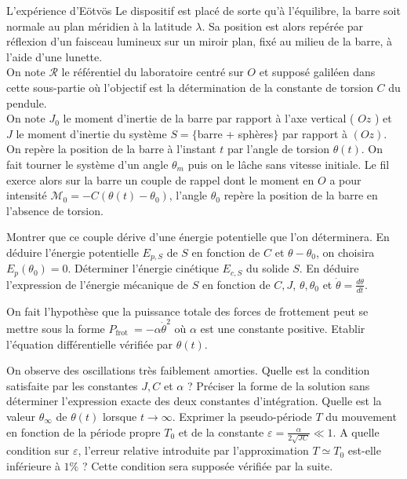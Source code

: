 \begin{exo}[PC][1][devoir]{L'expérience d'Eötvös}
Le dispositif est placé de sorte qu'à l'équilibre, la barre soit normale au plan méridien à la latitude $\lambda$. Sa position est alors repérée par réflexion d'un faisceau lumineux sur un miroir plan, fixé au milieu de la barre, à l'aide d'une lunette.\\
On note $\mathscr{R}$ le référentiel du laboratoire centré sur $O$ et supposé galiléen dans cette sous-partie où l'objectif est la détermination de la constante de torsion $C$ du pendule.\\
On note $J_{0}$ le moment d'inertie de la barre par rapport à l'axe vertical ( $O z$ ) et $J$ le moment d'inertie du système $S=\{$barre + sphères$\}$ par rapport à $(O z)$. On repère la position de la barre à l'instant $t$ par l'angle de torsion $\theta(t)$. On fait tourner le système d'un angle $\theta_{m}$ puis on le lâche sans vitesse initiale. Le fil exerce alors sur la barre un couple de rappel dont le moment en $O$ a pour intensité $\mathcal{M}_{0}=-C\left(\theta(t)-\theta_{0}\right)$, l'angle $\theta_{0}$ repère la position de la barre en l'absence de torsion.

\begin{quest}
  \item  Montrer que ce couple dérive d'une énergie potentielle que l'on déterminera. En déduire l'énergie potentielle $E_{p, S}$ de $S$ en fonction de $C$ et $\theta-\theta_{0}$, on choisira $E_{p}\left(\theta_{0}\right)=0$. Déterminer l'énergie cinétique $E_{c, S}$ du solide $S$. En déduire l'expression de l'énergie mécanique de $S$ en fonction de $C, J$, $\theta, \theta_{0}$ et $\dot{\theta}=\frac{d \theta}{d t}$.
  \item  On fait l'hypothèse que la puissance totale des forces de frottement peut se mettre sous la forme $P_{\text {frot }}=-\alpha \dot{\theta}^{2}$ où $\alpha$ est une constante positive. Etablir l'équation différentielle vérifiée par $\theta(t)$.
  \item  On observe des oscillations très faiblement amorties. Quelle est la condition satisfaite par les constantes $J, C$ et $\alpha$ ? Préciser la forme de la solution sans déterminer l'expression exacte des deux constantes d'intégration. Quelle est la valeur $\theta_{\infty}$ de $\theta(t)$ lorsque $t \rightarrow \infty$. Exprimer la pseudo-période $T$ du mouvement en fonction de la période propre $T_{0}$ et de la constante $\varepsilon=\frac{\alpha}{2 \sqrt{J C}} \ll 1$. A quelle condition sur $\varepsilon$, l'erreur relative introduite par l'approximation $T \simeq T_{0}$ est-elle inférieure à $1 \%$ ? Cette condition sera supposée vérifiée par la suite.
\end{quest}


\end{exo}
